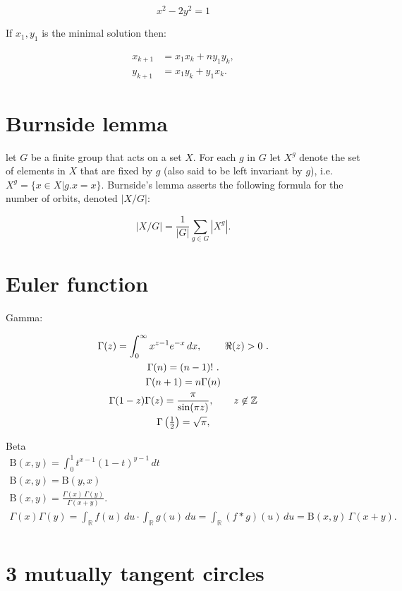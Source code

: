 \documentclass[a4paper]{article}
\begin{document}
\begin{landscape}
\begin{multicols}{2}
 $$x^2 - 2y^2=1$$
 
 If $x_1, y_1$ is the minimal solution then:
 
 \begin{align*}
    x_{k+1}&=x_{1}x_{k}+ny_{1}y_{k},\\
    y_{k+1} &= x_1 y_k + y_1 x_k.
 \end{align*}

\section{Burnside lemma}

let $G$ be a finite group that acts on a set $X$. For each $g$ in $G$ let $X^g$ denote the set of elements in $X$ that are fixed by $g$ (also said to be left invariant by $g$), i.e. $X^g = \{ x \in X | g.x = x \}$. Burnside's lemma asserts the following formula for the number of orbits, denoted $|X/G|$:

$$ |X/G|={\frac {1}{|G|}}\sum _{g\in G}|X^{g}|.$$

\section{Euler function}

Gamma:

\begin{gather*}
\Gamma (z)=\int _{0}^{\infty }x^{z-1}e^{-x}\,dx,\ \qquad \Re (z)>0\ .\\
\Gamma (n)=(n-1)!\ .\\
  \Gamma (n+1)=n\Gamma (n)\\
  \Gamma (1-z)\Gamma (z)={\pi  \over \sin(\pi z)},\qquad z\not \in \mathbb {Z} \\
 \Gamma \left({\tfrac {1}{2}}\right)={\sqrt {\pi }},\\
\end{gather*}

Beta
\begin{gather*}
 \mathrm {B} (x,y)=\int _{0}^{1}t^{x-1}(1-t)^{y-1}\,dt\\
 \mathrm {B} (x,y)=\mathrm {B} (y,x)\\
 \mathrm {B} (x,y)={\frac {\Gamma (x)\,\Gamma (y)}{\Gamma (x+y)}}.\\
 \Gamma (x)\Gamma (y)=\int _{\mathbb {R} }f(u)\,du\cdot \int _{\mathbb {R} }g(u)\,du=\int _{\mathbb {R} }(f*g)(u)\,du=\mathrm {B} (x,y)\,\Gamma (x+y).\\
\end{gather*}

\section{3 mutually tangent circles}


\end{multicols}
\end{landscape}
\end{document}
